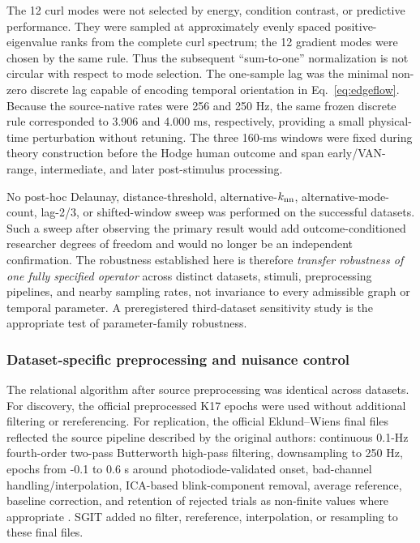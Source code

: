 \documentclass[12pt]{article}
\begin{document}
The 12 curl modes were not selected by energy, condition contrast, or predictive performance. They were sampled at approximately evenly spaced positive-eigenvalue ranks from the complete curl spectrum; the 12 gradient modes were chosen by the same rule. Thus the subsequent ``sum-to-one'' normalization is not circular with respect to mode selection. The one-sample lag was the minimal non-zero discrete lag capable of encoding temporal orientation in Eq.~\ref{eq:edgeflow}. Because the source-native rates were 256 and 250 Hz, the same frozen discrete rule corresponded to 3.906 and 4.000 ms, respectively, providing a small physical-time perturbation without retuning. The three 160-ms windows were fixed during theory construction before the Hodge human outcome and span early/VAN-range, intermediate, and later post-stimulus processing.

No post-hoc Delaunay, distance-threshold, alternative-$k_{\rm nn}$, alternative-mode-count, lag-2/3, or shifted-window sweep was performed on the successful datasets. Such a sweep after observing the primary result would add outcome-conditioned researcher degrees of freedom and would no longer be an independent confirmation. The robustness established here is therefore \emph{transfer robustness of one fully specified operator} across distinct datasets, stimuli, preprocessing pipelines, and nearby sampling rates, not invariance to every admissible graph or temporal parameter. A preregistered third-dataset sensitivity study is the appropriate test of parameter-family robustness.

\subsubsection{Dataset-specific preprocessing and nuisance control}
The relational algorithm after source preprocessing was identical across datasets. For discovery, the official preprocessed K17 epochs were used without additional filtering or rereferencing. For replication, the official Eklund--Wiens final files reflected the source pipeline described by the original authors: continuous 0.1-Hz fourth-order two-pass Butterworth high-pass filtering, downsampling to 250 Hz, epochs from -0.1 to 0.6 s around photodiode-validated onset, bad-channel handling/interpolation, ICA-based blink-component removal, average reference, baseline correction, and retention of rejected trials as non-finite values where appropriate \citep{EklundWiens2018}. SGIT added no filter, rereference, interpolation, or resampling to these final files.
\end{document}
